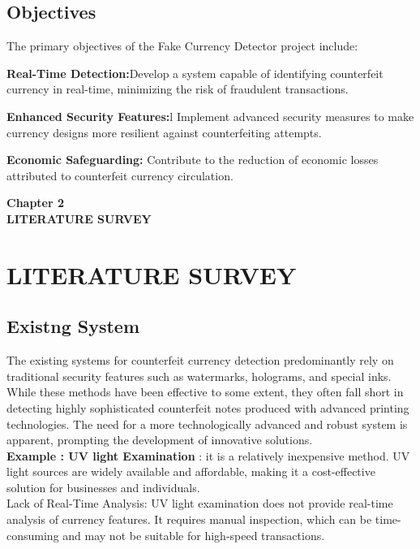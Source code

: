 \documentclass[12pt]{article}
\begin{document}
 \subsection{Objectives}
The primary objectives of the Fake Currency Detector project include:

\textbf{Real-Time Detection:}Develop a system capable of identifying counterfeit currency in real-time, minimizing the risk of fraudulent transactions.

\textbf{Enhanced Security Features:}l Implement advanced security measures to make currency designs more resilient against counterfeiting attempts.

\textbf{Economic Safeguarding:} Contribute to the reduction of economic losses attributed to counterfeit currency circulation.\\[1mm]

\clearpage

\begin{center}
 \LARGE \textbf {Chapter 2 }\\[10mm]
 \Large \textbf{LITERATURE SURVEY}\\[10mm]
 \end{center}
 \section{LITERATURE SURVEY}
 \subsection{Existng System}
The existing systems for counterfeit currency detection predominantly rely on traditional security features such as watermarks, holograms, and special inks. While these methods have been effective to some extent, they often fall short in detecting highly sophisticated counterfeit notes produced with advanced printing technologies. The need for a more technologically advanced and robust system is apparent, prompting the development of innovative solutions.
\\[0.5mm]\textbf{Example : UV light Examination} 
: it is a relatively inexpensive method. UV light sources are widely available and affordable, making it a cost-effective solution for businesses and individuals.
\\[0.5mm]Lack of Real-Time Analysis: UV light examination does not provide real-time analysis of currency features. It requires manual inspection, which can be time-consuming and may not be suitable for high-speed transactions.
\end{document}
